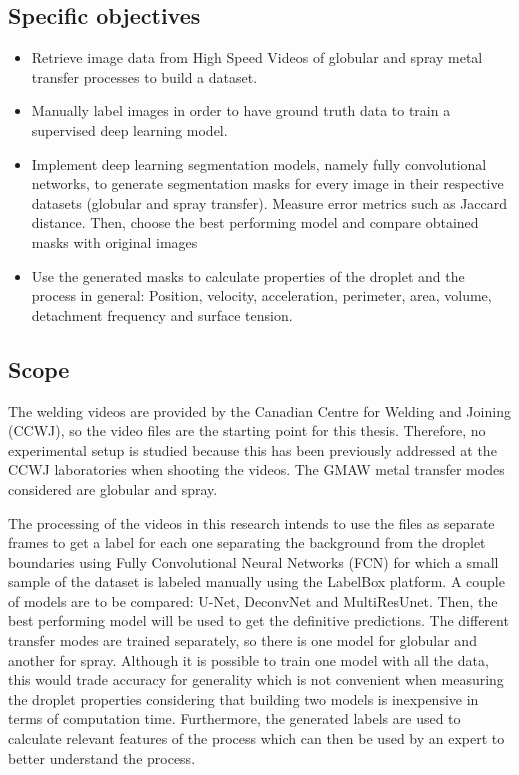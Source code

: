 \begin{intro}
\subsection{Specific objectives}
\begin{itemize}
    \item Retrieve image data from High Speed Videos of globular and spray metal transfer processes to build a dataset.
    \item Manually label images in order to have ground truth data to train a supervised deep learning model.
    \item Implement deep learning segmentation models, namely fully convolutional networks, to generate segmentation masks for every image in their respective datasets (globular and spray transfer). Measure error metrics such as Jaccard distance. Then, choose the best performing model and compare obtained masks with original images
    \item Use the generated masks to calculate properties of the droplet and the process in general: Position, velocity, acceleration, perimeter, area, volume, detachment frequency and surface tension.

\end{itemize}

\subsection{Scope}

The welding videos are provided by the Canadian Centre for Welding and Joining (CCWJ), so the video files are the starting point for this thesis. Therefore, no experimental setup is studied because this has been previously addressed at the CCWJ laboratories when shooting the videos. The GMAW metal transfer modes considered are globular and spray.

The processing of the videos in this research intends to use the files as separate frames to get a label for each one separating the background from the droplet boundaries using Fully Convolutional Neural Networks (FCN) for which a small sample of the dataset is labeled manually using the LabelBox platform. A couple of models are to be compared: U-Net, DeconvNet and MultiResUnet. Then, the best performing model will be used to get the definitive predictions. The different transfer modes are trained separately, so there is one model for globular and another for spray. Although it is possible to train one model with all the data, this would trade accuracy for generality which is not convenient when measuring the droplet properties considering that building two models is inexpensive in terms of computation time. Furthermore, the generated labels are used to calculate relevant features of the process which can then be used by an expert to better understand the process.


\end{intro}
